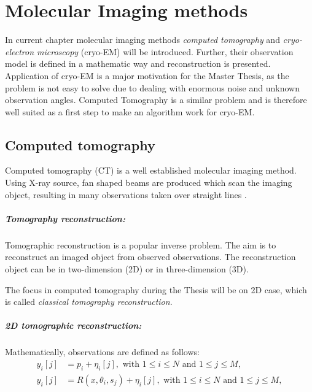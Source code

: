 \chapter{Molecular Imaging methods}
\label{sec:imaging}

In current chapter molecular imaging methods \textit{computed tomography} and 
\textit{cryo-electron microscopy} (cryo-EM) will be introduced. 
Further, their observation model is defined in a mathematic way and reconstruction is presented.
Application of cryo-EM is a major motivation for the Master Thesis, 
as the problem is not easy to solve due to dealing with enormous noise and unknown observation angles.
Computed Tomography is a similar problem and is therefore well suited as a
first step to make an algorithm work for cryo-EM. 


\section{Computed tomography}
Computed tomography (CT) is a well established molecular imaging method.
Using X-ray source, fan shaped beams are produced which scan the imaging object,
resulting in many observations taken over straight lines \cite{computedTomography}.

\paragraph{Tomography reconstruction:}
Tomographic reconstruction \cite{tomographicReconstruction} is a popular inverse problem. 
The aim is to reconstruct an imaged object from observed observations.
The reconstruction object can be in two-dimension (2D) or in three-dimension (3D). 

\begin{tcolorbox}[colback=red!5!white,colframe=red!75!black]
    The focus in computed tomography during the Thesis will be on 2D case, which is called \textit{classical tomography reconstruction}.
\end{tcolorbox}

\paragraph{2D tomographic reconstruction:}

Mathematically, observations are defined as follows:
\begin{equation}
    \label{eq:2Dreconstruction}
    \begin{aligned}
        y_i[j] &= p_i + \eta_i[j] , \text{ with } 1 \leq i \leq N \text{ and } 1 \leq j \leq M, \\
        y_i[j] &= R(x, \theta_i, s_j) + \eta_i[j] , \text{ with } 1 \leq i \leq N \text{ and } 1 \leq j \leq M,
    \end{aligned}
\end{equation}

